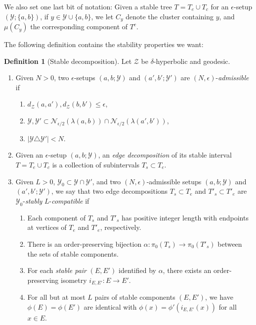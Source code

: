 \documentclass{amsart}
\theoremstyle{definition}
\newtheorem{definition}[theorem]{Definition}
\theoremstyle{remark}
\theoremstyle{definition}
\newcommand{\calN}{\mathcal{N}}
\newcommand{\calY}{\mathcal{Y}}
\newcommand{\calZ}{\mathcal{Z}}
\begin{document}
We also set one last bit of notation: Given a stable tree $T = T_e \cup T_c$ for an $\epsilon$-setup $(\calY; \{a,b\})$, if $y \in \calY \cup \{a,b\}$, we let $C_y$ denote the cluster containing $y$, and $\mu(C_y)$ the corresponding component of $T^c$.

The following definition contains the stability properties we want:

\begin{definition}[Stable decomposition] \label{defn:stable decomp}
Let $\calZ$ be $\delta$-hyperbolic and geodesic.  
\begin{enumerate}
\item Given $N>0$, two $\epsilon$-setups $(a,b; \calY)$ and $(a',b'; \calY')$ are $(N,\epsilon)$-\emph{admissible} if
\begin{enumerate}
\item $d_{\calZ}(a,a'), d_{\calZ}(b,b') \leq \epsilon$,
\item $\calY, \calY' \subset \calN_{\epsilon/2}(\lambda(a,b)) \cap \calN_{\epsilon/2}(\lambda(a',b'))$,
\item $|\calY \triangle \calY'| < N$.
\end{enumerate}
\item Given an $\epsilon$-setup $(a,b;\calY)$, an \emph{edge decomposition} of its stable interval $T = T_e \cup T_c$ is a collection of subintervals $T_s \subset T_e$.
\item Given $L>0$, $\calY_0 \subset \calY \cap \calY'$, and two $(N,\epsilon)$-admissible setups $(a,b;\calY)$ and $(a',b'; \calY')$, we say that two edge decompositions $T_s \subset T_e$ and $T'_s \subset T'_e$ are $\calY_0$-\emph{stably} $L$-\emph{compatible} if
\begin{enumerate}
\item Each component of $T_s$ and $T'_s$ has positive integer length with endpoints at vertices of $T_e$ and $T'_e$, respectively. \label{item:integer length}
\item There is an order-preserving bijection $\alpha:\pi_0(T_s) \to \pi_0(T'_s)$ between the sets of stable components. \label{item:stable bijection}
\item For each \emph{stable pair} $(E, E')$ identified by $\alpha$, there exists an order-preserving isometry $i_{E,E'}:E \to E'$. \label{item:stable pairs}
\item For all but at most $L$ pairs of stable components $(E,E')$, we have $\phi(E) = \phi(E')$ are identical with $\phi(x) = \phi'(i_{E,E'}(x))$ for all $x \in E$. \label{item:identical pairs}

\end{enumerate}
\end{enumerate}
\end{definition}
\end{document}
